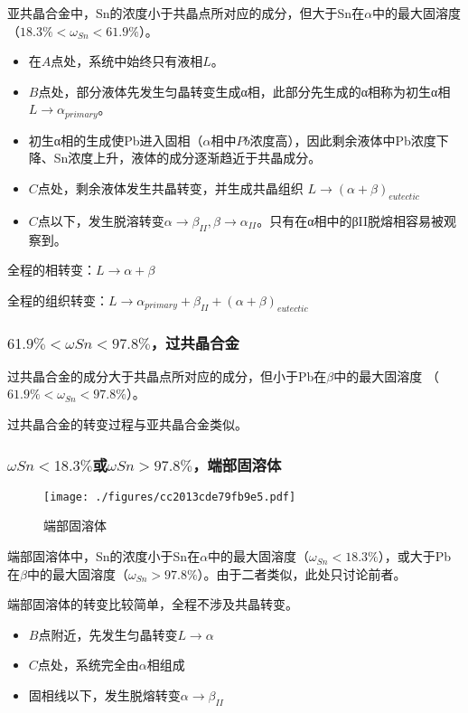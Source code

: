 亚共晶合金中，Sn的浓度小于共晶点所对应的成分，但大于Sn在$\alpha$中的最大固溶度 （$18.3\%<\omega_{Sn}<61.9\%$）。

\begin{itemize}
\item 在$A$点处，系统中始终只有液相$L$。
\item $B$点处，部分液体先发生匀晶转变生成α相，此部分先生成的α相称为初生α相$L \rightarrow \alpha_{primary}$。
\item 初生α相的生成使Pb进入固相（$\alpha$相中$Pb$浓度高），因此剩余液体中Pb浓度下降、Sn浓度上升，液体的成分逐渐趋近于共晶成分。
\item $C$点处，剩余液体发生共晶转变，并生成共晶组织 $L \rightarrow (\alpha+\beta)_{eutectic}$
\item $C$点以下，发生脱溶转变$\alpha \rightarrow \beta_{II}, \beta \rightarrow \alpha_{II}$。只有在α相中的βII脱熔相容易被观察到。
\end{itemize}

全程的相转变：$L \rightarrow \alpha+\beta$

全程的组织转变：$L \rightarrow \alpha_{primary}+\beta_{II}+(\alpha+\beta)_{eutectic}$

\subsubsection{$61.9\%<\omega Sn<97.8\%$，过共晶合金}
过共晶合金的成分大于共晶点所对应的成分，但小于Pb在$\beta$中的最大固溶度 （$61.9\%<\omega_{Sn}<97.8\%$）。

过共晶合金的转变过程与亚共晶合金类似。

\subsubsection{$\omega Sn<18.3\%$或$\omega Sn>97.8\%$，端部固溶体}
\begin{figure}[ht]
\centering
\texttt{[image: ./figures/cc2013cde79fb9e5.pdf]}
\caption{端部固溶体} \label{fig_EUTECT_4}
\end{figure}
端部固溶体中，Sn的浓度小于Sn在$\alpha$中的最大固溶度（$\omega_{Sn}<18.3\%$），或大于Pb在$\beta$中的最大固溶度（$\omega_{Sn}>97.8\%$）。由于二者类似，此处只讨论前者。

端部固溶体的转变比较简单，全程不涉及共晶转变。
\begin{itemize}
\item $B$点附近，先发生匀晶转变$L \rightarrow \alpha$
\item $C$点处，系统完全由$\alpha$相组成
\item 固相线以下，发生脱熔转变$\alpha \rightarrow \beta_{II}$
\end{itemize}

